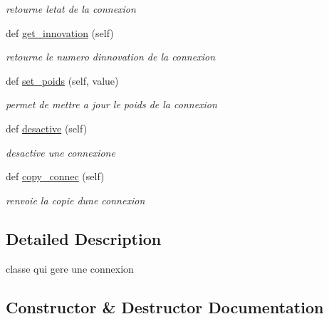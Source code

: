 \begin{DoxyCompactItemize}
\begin{DoxyCompactList}\small\item\em retourne l\textquotesingle{}etat de la connexion \end{DoxyCompactList}\item 
def \hyperlink{classsrc_1_1_i_a_1_1connexiongene_1_1_connexion_gene_aa805d85d7c3e8b23d1bd8f97f749f4e0}{get\+\_\+innovation} (self)
\begin{DoxyCompactList}\small\item\em retourne le numero d\textquotesingle{}innovation de la connexion \end{DoxyCompactList}\item 
def \hyperlink{classsrc_1_1_i_a_1_1connexiongene_1_1_connexion_gene_ad6f8d0dc7d4b9a76c702dc1c014808d2}{set\+\_\+poids} (self, value)
\begin{DoxyCompactList}\small\item\em permet de mettre a jour le poids de la connexion \end{DoxyCompactList}\item 
def \hyperlink{classsrc_1_1_i_a_1_1connexiongene_1_1_connexion_gene_a373a95f6b4ae8a025c61837df44092fb}{desactive} (self)
\begin{DoxyCompactList}\small\item\em desactive une connexione \end{DoxyCompactList}\item 
def \hyperlink{classsrc_1_1_i_a_1_1connexiongene_1_1_connexion_gene_a3d4bf887eeab6e6ac0006ce5d7cd0839}{copy\+\_\+connec} (self)
\begin{DoxyCompactList}\small\item\em renvoie la copie d\textquotesingle{}une connexion \end{DoxyCompactList}\end{DoxyCompactItemize}


\subsection{Detailed Description}
classe qui gere une connexion 

\subsection{Constructor \& Destructor Documentation}
\mbox{\label{classsrc_1_1_i_a_1_1connexiongene_1_1_connexion_gene_a7ec0e67af0142785e0094dee86c51bdd}} 
